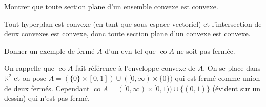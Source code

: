 \documentclass{fancybook}
\DeclareMathOperator{\co}{co}
\begin{document}
\begin{exercice}
Montrer que toute section plane d'un ensemble convexe est convexe.
\end{exercice}
Tout hyperplan est convexe (en tant que sous-espace vectoriel) et l'intersection de deux convexes est convexe, donc toute section plane d'un convexe est convexe.

\begin{exercice}
Donner un exemple de fermé $A$ d'un evn tel que $\co A$ ne soit pas fermée.
\end{exercice}
On rappelle que $\co A$ fait référence à l'enveloppe convexe de $A$. On se place dans $\mathbb R^2$ et on pose $A=(\{0\} \times [0,1] ) \cup ([0,\infty)\times \{0\})$ qui est fermé comme union de deux fermés. \newline
Cependant $\co A= ([0,\infty) \times [0,1)) \cup \{ (0,1)\}$ (évident sur un dessin) qui n'est pas fermé.
\end{document}
